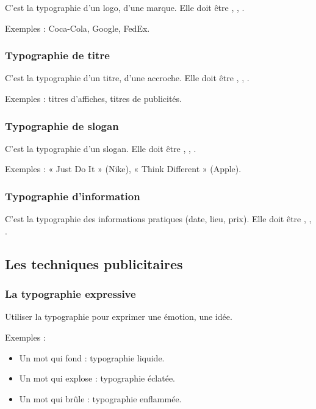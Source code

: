 C'est la typographie d'un logo, d'une marque. Elle doit être , , .

Exemples : Coca-Cola, Google, FedEx.

\subsubsection{Typographie de titre}

C'est la typographie d'un titre, d'une accroche. Elle doit être , , .

Exemples : titres d'affiches, titres de publicités.

\subsubsection{Typographie de slogan}

C'est la typographie d'un slogan. Elle doit être , , .

Exemples : « Just Do It » (Nike), « Think Different » (Apple).

\subsubsection{Typographie d'information}

C'est la typographie des informations pratiques (date, lieu, prix). Elle doit être , , .

\subsection{Les techniques publicitaires}

\subsubsection{La typographie expressive}

Utiliser la typographie pour exprimer une émotion, une idée.

Exemples :
\begin{itemize}
    \item Un mot qui fond : typographie liquide.
    \item Un mot qui explose : typographie éclatée.
    \item Un mot qui brûle : typographie enflammée.
\end{itemize}

